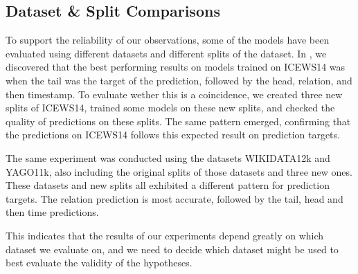 \subsection{Dataset \& Split Comparisons}
\label{subsec:dataset_split_comparisons}

To support the reliability of our observations, some of the models have been evaluated using different datasets and different splits of the dataset. In \cite{P9}, we discovered that the best performing results on models trained on ICEWS14 was when the tail was the target of the prediction, followed by the head, relation, and then timestamp. To evaluate wether this is a coincidence, we created three new splits of ICEWS14, trained some models on these new splits, and checked the quality of predictions on these splits. The same pattern emerged, confirming that the predictions on ICEWS14 follows this expected result on prediction targets.

The same experiment was conducted using the datasets WIKIDATA12k and YAGO11k, also including the original splits of those datasets and three new ones. These datasets and new splits all exhibited a different pattern for prediction targets. The relation prediction is most accurate, followed by the tail, head and then time predictions.

This indicates that the results of our experiments depend greatly on which dataset we evaluate on, and we need to decide which dataset might be used to best evaluate the validity of the hypotheses.